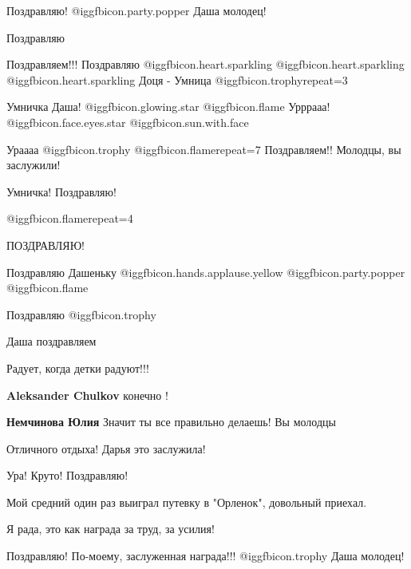\begin{itemize}
Поздравляю! @igg{fbicon.party.popper}  Даша молодец!

Поздравляю

Поздравляем!!!
Поздравляю  @igg{fbicon.heart.sparkling}   @igg{fbicon.heart.sparkling}   @igg{fbicon.heart.sparkling} 
Доця - Умница @igg{fbicon.trophy}{repeat=3} 

Умничка Даша!  @igg{fbicon.glowing.star}  @igg{fbicon.flame}  Урррааа! @igg{fbicon.face.eyes.star}  @igg{fbicon.sun.with.face} 

Ураааа @igg{fbicon.trophy}  @igg{fbicon.flame}{repeat=7} 
Поздравляем!! Молодцы, вы заслужили!

Умничка! Поздравляю!

 @igg{fbicon.flame}{repeat=4} 

ПОЗДРАВЛЯЮ!

Поздравляю Дашеньку @igg{fbicon.hands.applause.yellow}  @igg{fbicon.party.popper}  @igg{fbicon.flame} 

Поздравляю @igg{fbicon.trophy} 

Даша поздравляем

Радует, когда детки радуют!!!

\begin{itemize} %
\textbf{Aleksander Chulkov} конечно !

\textbf{Немчинова Юлия} Значит ты все правильно делаешь! Вы молодцы
\end{itemize} %

Отличного отдыха! Дарья это заслужила!

Ура! Круто! Поздравляю!

\begin{itemize} %
Мой средний один раз выиграл путевку в "Орленок", довольный приехал.
\end{itemize} %

Я рада, это как награда за труд, за усилия!

Поздравляю! По-моему, заслуженная награда!!! @igg{fbicon.trophy}  Даша молодец!



\end{itemize}
